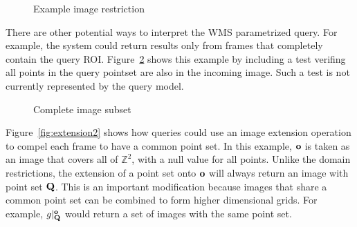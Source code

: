 \documentclass{ucdthesis}       %
\begin{document}
\begin{figure}[htb]
  \centering
  {
    \subfigure[$s|_Q$]{
      \begin{FramePic}[10,10]
      \end{FramePic}
    }
  }
  \caption{Example image restriction}
  \label{fig:restriction}
\end{figure} 

There are other potential ways to interpret the \ac{WMS} parametrized
query.  For example, the system could return results only from frames
that completely contain the query \ac{ROI}.  Figure~\ref{fig:subset}
shows this example by including a test verifing all points in the
query pointset are also in the incoming image.  Such a test is not
currently represented by the query model.

\begin{figure}[htb]
  \centering
  {
    \quad
  }
  \caption{Complete image subset}
  \label{fig:subset}
\end{figure}


Figure~\ref{fig:extension2} shows how queries could use an image
extension operation to compel each frame to have a common point set.
In this example, ${\bf{o}}$ is taken as an image that covers all of
$\mathbb{Z}^2$, with a null value for all points.  Unlike the domain
restrictions, the extension of a point set onto ${\bf{o}}$ will always
return an image with point set ${\bf{Q}}$.  This is an important
modification because images that share a common point set can be
combined to form higher dimensional grids.  For example,
$g|^{{\bf{o}}}_{\bf{Q}}$ would return a set of images with the same point
set.
\end{document}
